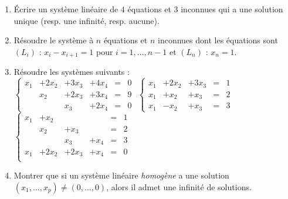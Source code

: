 \begin{frame}

\begin{miniexercice}
\begin{enumerate}
  \item \'Ecrire  un système linéaire de $4$ équations et $3$ 
  inconnues qui a une solution unique (resp. une infinité, resp. aucune).
  
  \item Résoudre le système à $n$ équations et $n$ inconnues dont les équations sont
  $(L_i)$ : $x_i - x_{i+1} = 1$ pour $i=1,\ldots, n-1$ et $(L_n)$ : $x_n=1$.
  
  \item Résoudre les systèmes suivants : \\
$\left\{  \begin{array}{cccccc}
 x_1 & +2x_2 & +3x_3 & +4x_4 &=& 0\\
     & x_2   & +2x_3 & +3x_4 &=& 9\\
     &       & x_3   & +2x_4 &=& 0
 \end{array} \right.
$ 
$\left\{  \begin{array}{ccccc}
 x_1 & +2x_2 & +3x_3 &=& 1\\
 x_1 & +x_2  & +x_3  &=& 2\\
 x_1 & -x_2  & +x_3  &=& 3
 \end{array} \right.
$   
$\left\{  \begin{array}{cccccc}
 x_1 & + x_2 &       &       &=& 1\\
     & x_2   & + x_3 &       &=& 2\\
     &       & x_3   & + x_4 &=& 3\\
 x_1 & +2x_2 & +2x_3 & + x_4 &=& 0\\     
 \end{array} \right.
$ 
  
  \item Montrer que si un système linéaire \emph{homogène} a une solution
  $(x_1,\ldots,x_p) \neq (0,\ldots,0)$, alors il admet une infinité de solutions.
  
\end{enumerate}

\end{miniexercice}

\end{frame}


